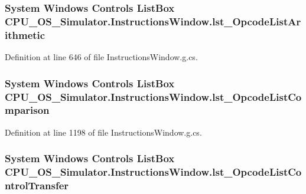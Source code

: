 \subsubsection[{lst\+\_\+\+Opcode\+List\+Arithmetic}]{\setlength{\rightskip}{0pt plus 5cm}System Windows Controls List\+Box C\+P\+U\+\_\+\+O\+S\+\_\+\+Simulator.\+Instructions\+Window.\+lst\+\_\+\+Opcode\+List\+Arithmetic\hspace{0.3cm}{\ttfamily [package]}}\label{class_c_p_u___o_s___simulator_1_1_instructions_window_a7445b276d3723f67ba564038940d44c5}


Definition at line 646 of file Instructions\+Window.\+g.\+cs.

\hypertarget{class_c_p_u___o_s___simulator_1_1_instructions_window_ae47949fa5657e55f8acd8e5b9cd204c0}{}
\subsubsection[{lst\+\_\+\+Opcode\+List\+Comparison}]{\setlength{\rightskip}{0pt plus 5cm}System Windows Controls List\+Box C\+P\+U\+\_\+\+O\+S\+\_\+\+Simulator.\+Instructions\+Window.\+lst\+\_\+\+Opcode\+List\+Comparison\hspace{0.3cm}{\ttfamily [package]}}\label{class_c_p_u___o_s___simulator_1_1_instructions_window_ae47949fa5657e55f8acd8e5b9cd204c0}


Definition at line 1198 of file Instructions\+Window.\+g.\+cs.

\hypertarget{class_c_p_u___o_s___simulator_1_1_instructions_window_a111f1ddd903fe40e0c83efeca42bdf51}{}
\subsubsection[{lst\+\_\+\+Opcode\+List\+Control\+Transfer}]{\setlength{\rightskip}{0pt plus 5cm}System Windows Controls List\+Box C\+P\+U\+\_\+\+O\+S\+\_\+\+Simulator.\+Instructions\+Window.\+lst\+\_\+\+Opcode\+List\+Control\+Transfer\hspace{0.3cm}{\ttfamily [package]}}\label{class_c_p_u___o_s___simulator_1_1_instructions_window_a111f1ddd903fe40e0c83efeca42bdf51}


